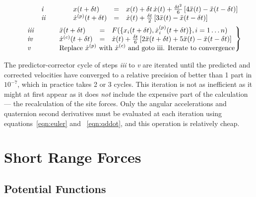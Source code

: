 \newlength{\myboxw}
\addtolength{\myboxw}{\textwidth}
\addtolength{\myboxw}{-15pt}
\begin{minipage}{\myboxw}
\begin{eqnarray}
& &
\begin{array}{llll}
\makebox[0.5in][l]{\em i} & x(t+\delta t) &=& x(t) + \delta t \, \dot{x}(t) + 
\frac{\delta t^2}{6} 
\left [ 4 \ddot{x}(t) - \ddot{x}(t-\delta t) \right ] \\
\makebox[0.5in][l]{\em ii}  & \dot{x}^{(p)}(t+\delta t) & = & \dot{x}(t) + 
\frac{\delta t}{2} \left [ 3 \ddot{x}(t)- \ddot{x}(t-\delta t) \right ]
\end{array} \nonumber \\
& &
\left .
\begin{array}{llll}
\makebox[0.5in][l]{\em iii}  & \ddot{x}(t+\delta t) & = & F(\{ x_i(t+\delta t),
\dot{x}_i^{(p)}(t+\delta t)\}, i =  1\ldots n) \\
\makebox[0.5in][l]{\em iv} & \dot{x}^{(c)}(t+\delta t) & = & \dot{x}(t) + \frac{\delta t}{6} 
\left [ 2 \ddot{x}(t+\delta t) + 5 \ddot{x}(t)- \ddot{x}(t-\delta t) \right ]\\
\makebox[0.5in][l]{\em v} & 
\lefteqn{\mbox{Replace } \dot{x}^{(p)} \mbox{ with }
\dot{x}^{(c)} \mbox{ and goto iii.  Iterate to convergence}}
\end{array} 
\right \}
\end{eqnarray}
\end{minipage}
\vspace{10pt}

The predictor-corrector cycle of steps {\em iii} to {\em v} are
iterated until the predicted and corrected velocities have converged
to a relative precision of better than 1 part in $10^{-7}$, which in
practice takes 2 or 3 cycles.  This iteration is not as inefficient as
it might at first appear as it does {\em not} include the expensive
part of the calculation --- the recalculation of the site forces.
Only the angular accelerations and quaternion second derivatives must
be evaluated at each iteration using equations~\ref{eqn:euler} and
~\ref{eqn:qddot}, and this operation is relatively cheap.

\section{Short Range Forces}
\subsection*{Potential Functions}

